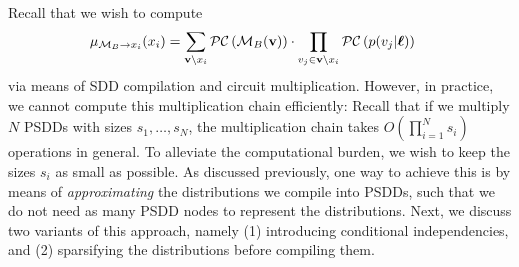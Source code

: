 Recall that we wish to compute
\begin{align}
    \mu_{\mathcal{M}_B \to x_i}(x_i) &= \sum_{\mathbf{v} \setminus x_i} \mathcal{PC} \left( \mathcal{M}_B(\mathbf{v}) \right) \cdot \prod_{v_j \in \mathbf{v} \setminus x_i} \mathcal{PC}\left( p(v_j | \boldsymbol{\ell}) \right)
\end{align}
via means of SDD compilation and circuit multiplication. However, in practice, we cannot compute this multiplication chain efficiently: Recall that if we multiply $N$ PSDDs with sizes $s_1, \dots, s_N$, the multiplication chain takes $O(\prod_{i=1}^N s_i)$ operations in general. To alleviate the computational burden, we wish to keep the sizes $s_i$ as small as possible. As discussed previously, one way to achieve this is by means of \emph{approximating} the distributions we compile into PSDDs, such that we do not need as many PSDD nodes to represent the distributions. Next, we discuss two variants of this approach, namely (1) introducing conditional independencies, and (2) sparsifying the distributions before compiling them.

